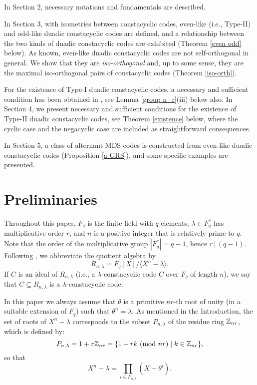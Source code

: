 \documentclass{article}
\numberwithin{equation}{section}
\numberwithin{table}{section}
\def\Z{{\Bbb Z}}
\begin{document}
In Section 2, necessary notations and fundamentals are described.

In Section 3,
with isometries between constacyclic codes, 
even-like (i.e., Type-II) and odd-like duadic constacyclic codes are defined, and
a relationship between the two kinds of duadic constacyclic codes are
exhibited (Theorem \ref{even odd} below).
As known, even-like duadic constacyclic codes are not self-orthogonal in general.
We show that they are {\em iso-orthogonal} and, up to some sense,
they are the maximal iso-orthogonal pairs of constacyclic codes
(Theorem \ref{iso-orth}). 

For the existence of Type-I duadic constacyclic codes,
a necessary and sufficient condition has been obtained in \cite[Th.4]{CDFL},
see Lemma \ref{group n_r}(iii) below also.
In Section 4, we present necessary and sufficient conditions for
the existence of Type-II duadic constacyclic codes,
see Theorem \ref{existence} below, where the cyclic case and the negacyclic case
are included as straightforward consequences.

In Section 5, a class of alternant MDS-codes is constructed from
even-like duadic constacyclic codes (Proposition \ref{a GRS}),
and some specific examples are presented.

\section{Preliminaries}

Throughout this paper, $F_q$ is the finite field with $q$ elements, 
$\lambda \in F_q^*$ has multiplicative order $r$, 
and $n$ is a positive integer that is relatively prime to $q$.
Note that the order of the multiplicative group $|F_q^*|=q-1$, 
hence $r\,|\, (q-1)$. Following \cite{Bl13}, 
we abbreviate the quotient algebra by
\begin{equation}\label{R_n,lambda}
 R_{n,\lambda}=F_q[X]/\langle X^n-\lambda\rangle.
\end{equation}
If $C$ is an ideal of $R_{n,\lambda}$ (i.e., a
$\lambda$-constacyclic code $C$ over $F_q$ of length $n$),
we say that $C\subseteq R_{n,\lambda}$ is a $\lambda$-constacyclic code. 

In this paper we always assume that $\theta$ is a primitive $n r$-th root of unity
(in a suitable extension of $F_q$) such that $\theta^n=\lambda$.
As mentioned in the Introduction, 
the set of roots of $X^n-\lambda$ corresponds to the
subset $P_{n,\lambda}$ of the residue ring $\Z_{nr}$, which is defined by:
\begin{equation}\label{P_n,lambda}
P_{n,\lambda}=1+r\Z_{nr}
=\{1+rk~({\rm mod}~nr)\mid k\in\Z_{nr}\},
\end{equation}
so that
$$
X^n-\lambda=\prod_{i\in P_{n,\lambda}}(X-\theta^i).
$$
\end{document}
